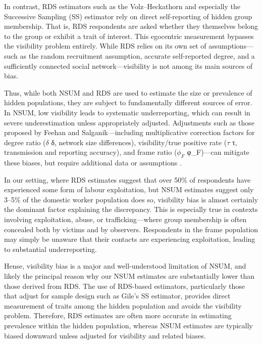 \documentclass[
  12pt,
  letterpaper,
  DIV=11,
  numbers=noendperiod]{scrartcl}
\theoremstyle{plain}
\theoremstyle{definition}
\begin{document}
In contrast, RDS estimators such as the Volz--Heckathorn and especially
the Successive Sampling (SS) estimator rely on direct self-reporting of
hidden group membership. That is, RDS respondents are asked whether they
themselves belong to the group or exhibit a trait of interest. This
egocentric measurement bypasses the visibility problem entirely. While
RDS relies on its own set of assumptions---such as the random
recruitment assumption, accurate self-reported degree, and a
sufficiently connected social network---visibility is not among its main
sources of bias.

Thus, while both NSUM and RDS are used to estimate the size or
prevalence of hidden populations, they are subject to fundamentally
different sources of error. In NSUM, low visibility leads to systematic
underreporting, which can result in severe underestimation unless
appropriately adjusted. Adjustments such as those proposed by Feehan and
Salganik---including multiplicative correction factors for degree ratio
(\(\delta\) δ, network size differences), visibility/true positive rate
(\(\tau\) τ, transmission and reporting accuracy), and frame ratio
(\(\phi_F\) φ\_F)---can mitigate these biases, but require additional
data or assumptions \autocite{feeh16-generalizing}.

In our setting, where RDS estimates suggest that over 50\% of
respondents have experienced some form of labour exploitation, but NSUM
estimates suggest only 3--5\% of the domestic worker population does so,
visibility bias is almost certainly the dominant factor explaining the
discrepancy. This is especially true in contexts involving exploitation,
abuse, or trafficking---where group membership is often concealed both
by victims and by observers. Respondents in the frame population may
simply be unaware that their contacts are experiencing exploitation,
leading to substantial underreporting.

Hense, visibility bias is a major and well-understood limitation of
NSUM, and likely the principal reason why our NSUM estimates are
substantially lower than those derived from RDS. The use of RDS-based
estimators, particularly those that adjust for sample design such as
Gile's SS estimator, provides direct measurement of traits among the
hidden population and avoids the visibility problem. Therefore, RDS
estimates are often more accurate in estimating prevalence within the
hidden population, whereas NSUM estimates are typically biased downward
unless adjusted for visibility and related biases.
\end{document}
